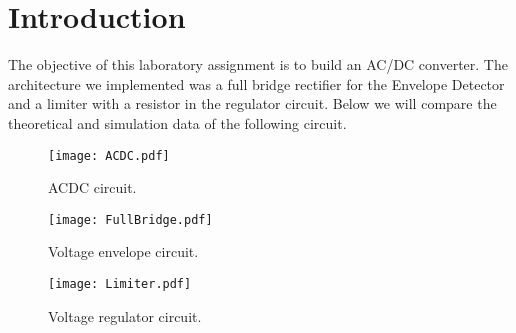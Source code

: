 \section{Introduction}
\label{sec:introduction}
The objective of this laboratory assignment is to build an AC/DC converter. The architecture we implemented was a full bridge rectifier for the Envelope Detector and a limiter with a resistor in the regulator circuit. Below we will compare the theoretical and simulation data of the following circuit.

\begin{figure}[h] \centering
\texttt{[image: ACDC.pdf]}
\caption{ACDC circuit.}
\end{figure}

\begin{figure}[h] \centering
\texttt{[image: FullBridge.pdf]}
\caption{Voltage envelope circuit.}
\end{figure}

\begin{figure}[h] \centering
\texttt{[image: Limiter.pdf]}
\caption{Voltage regulator circuit.}
\end{figure}

